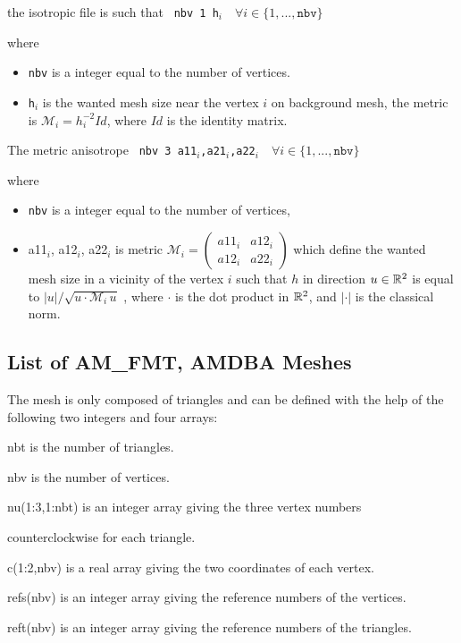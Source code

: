 \documentclass[a4paper,twoside,12pt]{book}
\begin{document}
the isotropic file is such that
{\tt \obeylines
   nbv  1
   h$_i \quad \forall i \in \{1,...,\mathtt{nbv}\}$
}


where
\begin{itemize}
\item {\tt  nbv} is  a integer equal to the number of vertices.
\item   {\tt h$_i$} is the wanted mesh size near the vertex $i$ on background mesh,
the metric is $\mathcal{M}_i=h_i^{-2} Id$, where $ Id $ is the identity matrix.
\end{itemize}

The metric anisotrope
{\tt \obeylines
   nbv  3
   a11$_i$,a21$_i$,a22$_i \quad \forall i \in \{1,...,\mathtt{nbv}\}$
}


where
\begin{itemize}
\item   {\tt nbv} is  a integer equal to the number of vertices,
\item  a11$_i$, a12$_i$, a22$_i$ is metric
$\mathcal{M}_i = \left(\begin{smallmatrix} a11_i & a12_i \\ a12_i & a22_i \end{smallmatrix}\right)$ which define the wanted mesh size
in a vicinity of  the vertex $i$
such that $h$ in direction $u \in \mathbb{R}^2$ is equal to $ |u|/\sqrt{u\cdot\mathcal{M}_i\, u}$ , where $\cdot$ is the dot product
in $\mathbb{R}^2$, and $|\cdot|$ is the classical norm.

\end{itemize}

\subsection{List of  AM\_FMT, AMDBA Meshes}
 The mesh is only composed of triangles and can be defined with the help of
the following two integers and four arrays:

  \begin{ttlist}
  \item [nbt] is the number of triangles.
  \item [nbv] is the number of vertices.

  \item [nu(1:3,1:nbt)] is an integer array giving the three vertex numbers

counterclockwise for each triangle.

  \item [c(1:2,nbv)]    is a real array giving the two coordinates of each vertex.
  \item [refs(nbv)]     is an integer array giving the reference numbers of the
vertices.
  \item [reft(nbv)]     is an integer array giving the reference numbers of the
triangles.
  \end{ttlist}
\end{document}
